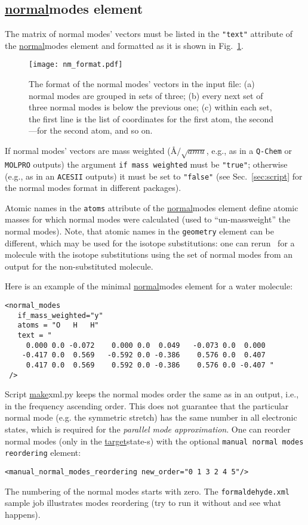 \documentclass[11pt]{article}
\begin{document}
\subsection{\ul{normal}{modes} element}
\label{sec:nmodes}

The matrix of normal modes' vectors must be listed in the {\tt "text"} attribute of the \ul{normal}{modes} element and
formatted as it is shown in Fig.~\ref{fig:nm_format}.
\begin{figure}[h!]
  \centering
  \caption{The format of the normal modes' vectors in the input file:
(a) normal modes are grouped in sets of three; 
(b) every next set of three normal modes is below the previous one; 
(c) within each set, the first line is the list of coordinates for the first atom, 
the second---for the second atom, and so on.}
  \texttt{[image: nm\_format.pdf]}
  \label{fig:nm_format}
\end{figure}

If normal modes' vectors are mass weighted 
(\AA$/\sqrt{amu}$, e.g., as in a {\tt Q-Chem} or {\tt MOLPRO} outputs) the argument 
{\tt if mass weighted} must be {\tt "true"}; 
otherwise (e.g., as in an {\tt ACESII} outputs) it must be set to {\tt "false"}
(see Sec.~\ref{sec:script} for the normal modes format in different \ai packages).

Atomic names in the {\tt atoms} attribute of the \ul{normal}{modes} element 
define atomic masses for which normal modes were calculated (used to ``un-massweight'' the normal modes).
Note, that atomic names in the {\tt geometry} element can be different,
which may be used for the isotope substitutions: one can rerun \ezFCF\ for a molecule with
the isotope substitutions using the set of normal modes from an \ai output for the non-substituted molecule.

Here is an example of the minimal \ul{normal}{modes} element for a water molecule:
\begin{lstlisting}[frame=single,framerule=0pt]
<normal_modes
   if_mass_weighted="y"
   atoms = "O   H   H"
   text = "
     0.000 0.0 -0.072    0.000 0.0  0.049   -0.073 0.0  0.000
    -0.417 0.0  0.569   -0.592 0.0 -0.386    0.576 0.0  0.407
     0.417 0.0  0.569    0.592 0.0 -0.386    0.576 0.0 -0.407 "
 />
\end{lstlisting}

Script \ul{make}{xml.py} keeps the normal modes order the same as in an \ai output, i.e., in the frequency ascending order. 
This does not guarantee that the particular normal mode 
(e.g. the symmetric stretch) has the same number 
in all electronic states, which is required for the {\em parallel mode approximation}.
One can reorder normal modes (only in the \ul{target}{state}-s) with the optional 
{\tt manual normal modes reordering} element:
\begin{lstlisting}[frame=single,framerule=0pt]
  <manual_normal_modes_reordering new_order="0 1 3 2 4 5"/>
\end{lstlisting}
The numbering of the normal modes starts with zero. The \texttt{formaldehyde.xml} sample job
illustrates modes reordering (try to run it without and see what happens).
\end{document}
